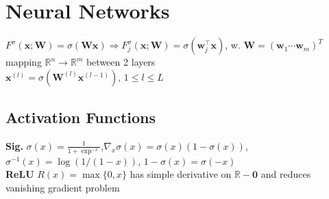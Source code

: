 \section*{Neural Networks}
$F^\sigma(\mathbf{x};\mathbf{W}){=}\sigma(\mathbf{W}\mathbf{x}){\Rightarrow}F^\sigma_j(\mathbf{x};\mathbf{W}){=}\sigma(\mathbf{w}_j^\top\mathbf{x})$, w.
$\mathbf{W}{=}(\mathbf{w}_1\dotsi\mathbf{w}_m)^T$
mapping $\mathbb{R}^n\rightarrow\mathbb{R}^m$ between 2 layers\\
$\mathbf{x}^{(l)}=\sigma(\mathbf{W}^{(l)}\mathbf{x}^{(l-1)})$, $1\leq l\leq L$

\subsection*{Activation Functions}
\textbf{Sig.}
$\sigma(x){=}\frac{1}{1+\exp^{-x}}$,$\nabla_x\sigma(x){=}\sigma(x)(1{-}\sigma(x))$, $\sigma^{-1}(x)=\log(1/(1{-}x))$, $1{-}\sigma(x){=}\sigma(-x)$\\
\textbf{ReLU}
$R(x){=}\max\{0,x\}$ has simple derivative on $\mathbb{R}-\mathbf{0}$ and reduces vanishing gradient problem


